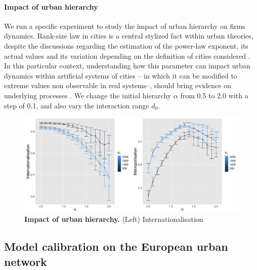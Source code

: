 \documentclass[10pt,letterpaper]{article}
\begin{document}
\paragraph{Impact of urban hierarchy}

We run a specific experiment to study the impact of urban hierarchy on firms dynamics. Rank-size law in cities is a central stylized fact within urban theories, despite the discussions regarding the estimation of the power-law exponent, its actual values and its variation depending on the definition of cities considered \cite{cottineau2017metazipf,corral2020truncated}. In this particular context, understanding how this parameter can impact urban dynamics within artificial systems of cities -- in which it can be modified to extreme values non observable in real systems--, should bring evidence on underlying processes \cite{raimbault2019space}. We change the initial hierarchy $\alpha$ from 0.5 to 2.0 with a step of 0.1, and also vary the interaction range $d_0$.



\begin{figure}
    \begin{center}
        \includegraphics[width=\linewidth]{figures/Fig7.png}
    \end{center}
    \caption{\textbf{Impact of urban hierarchy.} (Left) Internationalisation \label{fig:fig7}}
\end{figure}



\subsection*{Model calibration on the European urban network}
\end{document}
